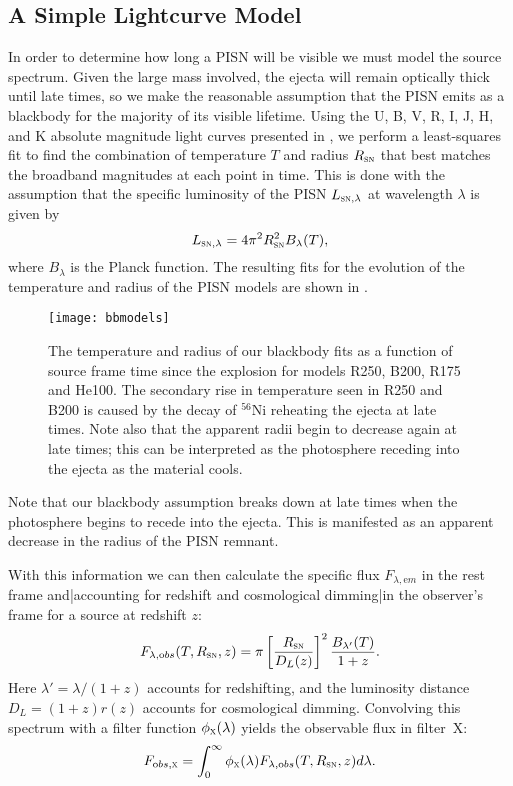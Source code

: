 \documentclass[../thesis.tex]{subfiles}
\begin{document}
\subsection{A Simple Lightcurve Model}
In order to determine how long a PISN will be visible we must model
the source spectrum. Given the large mass involved, the ejecta will
remain optically thick until late times, so we make the reasonable
assumption that the PISN emits as a blackbody for the majority of its
visible lifetime.  Using the U, B, V, R, I, J, H, and K absolute
magnitude light curves presented in \citet{KasenWoosleyHeger2011}, we
perform a least-squares fit to find the combination of temperature $T$
and radius $R_{\textsc{sn}}$ that best matches the broadband
magnitudes at each point in time. This is done with the assumption
that the specific luminosity of the PISN $L_{\textsc{sn}, \lambda}$ at
wavelength $\lambda$ is given by
\begin{equation}
L_{\textsc{sn},\lambda} = 4\pi^2 R_{\textsc{sn}}^2 B_{\lambda}(T),
\end{equation}
where $B_{\lambda}$ is the Planck function. The resulting fits for the
evolution of the temperature and radius of the PISN models are shown in
.
\begin{figure}
  \begin{center}
    \texttt{[image: bbmodels]}
    \caption{The temperature and radius of our blackbody
      fits as a function of source frame time since the explosion
      for models R250, B200, R175 and He100.  The secondary rise in
      temperature seen in R250 and B200 is caused by the decay of
      $^{56}$Ni reheating the ejecta at late times.  Note also that the
      apparent radii begin to decrease again at late times; this can
      be interpreted as the photosphere receding into the ejecta as
      the material cools.}
    \label{bbmodels}
  \end{center}
\end{figure}
Note that our blackbody assumption breaks down at late times when the
photosphere begins to recede into the ejecta.  This is manifested as
an apparent decrease in the radius of the PISN remnant.

With this information we can then calculate the specific flux
$F_{\lambda, \mathrm em}$ in the rest frame and|accounting for redshift
and cosmological dimming|in the observer's frame for a source at
redshift $z$:
\begin{equation}
F_{\lambda, \mathrm obs}(T,R_{\textsc{sn}}, z) = \pi
\left[\frac{R_{\textsc{sn}}}{D_L(z)}\right]^2
\frac{B_{\lambda'}(T)}{1+z}.
\end{equation}
Here $\lambda' = \lambda/(1+z)$ accounts for redshifting, and the
luminosity distance $D_L = (1+z) r(z)$ accounts for cosmological
dimming.  Convolving this spectrum with a filter function
$\phi_\textsc{x}(\lambda)$ yields the observable flux in filter~X:
\begin{equation}
F_{\mathrm obs, \textsc{x}} = \int_{0}^{\infty} \phi_\textsc{x}(\lambda)
F_{\lambda, \mathrm obs}(T,R_{\textsc{sn}}, z) d\lambda.
\end{equation}
\end{document}
